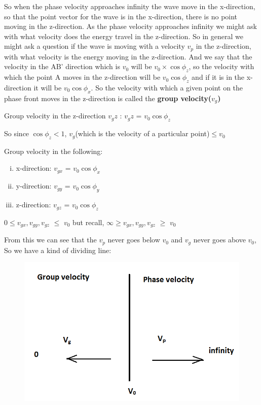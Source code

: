 So when the phase velocity approaches infinity the wave move in the x-direction, so that the point vector for the wave is in the x-direction, there is no point moving in the z-direction.
As the phase velocity approaches infinity we might ask with what velocity does the energy travel in the z-direction.
So in general we might ask a question if the wave is moving with a velocity $v_p$ in the z-direction, with what velocity is the energy moving in the z-direction.
And we say that the velocity in the AB' direction which is $v_0$ will be $v_0\times\cos\phi_{z}$, so the velocity with which the point A moves in the z-direction will be $v_0\cos\phi_{z}$ and if it is in the x-direction it will be $v_0\cos\phi_{x}$. So the velocity with which a given point on the phase front moves in the z-direction is called the \textbf{group velocity($v_g$)}

\begin{center}
Group velocity in the z-direction $v_gz$ :
$v_gz$ = $v_0\cos\phi_{z}$
\end{center}
So since $\cos\phi_{z} < 1$, $v_g$(which is the velocity of a particular point)$\leq v_0$


Group velocity in the following:
\begin{enumerate}[(i)]
\item x-direction:	$v_{gx}$ = $v_0\cos\phi_{x}$
\item y-direction: 	$v_{gy}$ = $v_0\cos\phi_{y}$
\item z-direction:	$v_{gz}$ = $v_0\cos\phi_{z}$
\end{enumerate}
$0\leq v_{gx},v_{gy},v_{gz}$ $\leq$ $v_0$ but recall, $\infty\geq v_{gx},v_{gy},v_{gz}$ $\geq$ $v_0$

From this we can see that the $v_p$ never goes below $v_0$ and $v_g$ never goes above $v_0$,
So we have a kind of dividing line:
\begin{figure}[h]
\centering
\includegraphics[width=.6\linewidth]{./graphics/img3}
\caption{}
\end{figure}

